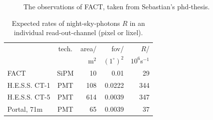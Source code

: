 \documentclass{article}%
\begin{document}
\begin{multicols}{2}
\begin{figure}[H]
\caption{
The observations of FACT, taken from Sebastian's phd-thesis.
}%
\label{fig:obstimeFact}
\end{figure}
%
\begin{table}[H]
  \begin{center}
    \begin{tabular}{lcrrr}
        &tech.& area/ & fov/&$R$/\\
        &     & m$^2$ & $(1^\circ)^{2}$&$10^6$s$^{-1}$\\
      \hline
      FACT &SiPM& 10 & 0.01 & 29\\
      H.E.S.S. CT-1 &PMT& 108 & 0.0222 & 344\\
      H.E.S.S. CT-5 &PMT& 614 & 0.0039 & 347\\
      Portal, 71m &PMT& 65 & 0.0039 & 37\\
    \end{tabular}
    \caption{Expected rates of night-sky-photons $R$ in an individual read-out-channel (pixel or lixel).}
    \label{TabInstrumentsNsbRates}
  \end{center}
\end{table}
%

\end{multicols}
\end{document}
